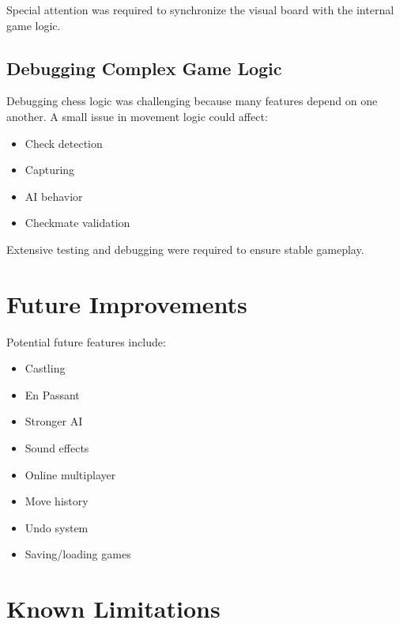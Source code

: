 \documentclass[11pt]{article}
\begin{document}
Special attention was required to synchronize the visual board with the internal game logic.

\subsection{Debugging Complex Game Logic}

Debugging chess logic was challenging because many features depend on one another. A small issue in movement logic could affect:

\begin{itemize}
    \item Check detection
    \item Capturing
    \item AI behavior
    \item Checkmate validation
\end{itemize}

Extensive testing and debugging were required to ensure stable gameplay.


\section{Future Improvements}

Potential future features include:

\begin{itemize}
    \item Castling
    \item En Passant
    \item Stronger AI
    \item Sound effects
    \item Online multiplayer
    \item Move history
    \item Undo system
    \item Saving/loading games
\end{itemize}


\section{Known Limitations}
\end{document}
